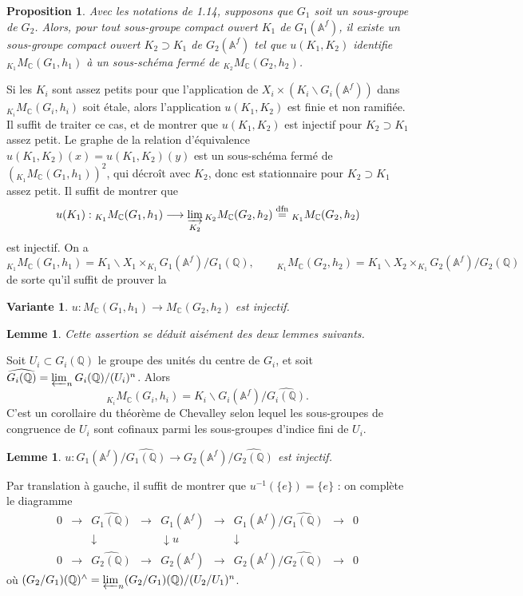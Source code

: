 \documentclass[11pt]{amsart}
\theoremstyle{plain}
\newtheorem{proposition}[theorem]{Proposition}
\newtheorem{lemma}[theorem]{Lemme}
\newtheorem{variante}{Variante}
\theoremstyle{definition}
\newcommand{\QQ}{\mathbb{Q}}
\newcommand{\AAf}{\mathbb{A}^f}
\newcommand{\MC}{M_{\mathbb{C}}}
\begin{document}
\begin{proposition}
Avec les notations de \emph{1.14}, supposons que $G_1$ soit un sous-groupe de $G_2$. Alors, pour tout sous-groupe compact ouvert $K_1$ de $G_1(\AAf)$, il existe un sous-groupe compact ouvert $K_2 \supset K_1$ de $G_2(\AAf)$ tel que $u(K_1, K_2)$ identifie ${}_{K_1} \MC(G_1, h_1)$ \`a un sous-sch\'ema ferm\'e de ${}_{K_2} \MC(G_2, h_2)$.
\end{proposition}

Si les $K_i$ sont assez petits pour que l'application de $X_i \times (K_i \backslash G_i(\AAf))$ dans ${}_{K_i} \MC(G_i, h_i)$ soit \'etale, alors l'application $u(K_1, K_2)$ est finie et non ramifi\'ee. Il suffit de traiter ce cas, et de montrer que $u(K_1, K_2)$ est injectif pour $K_2 \supset K_1$ assez petit. Le graphe de la relation d'\'equivalence $u(K_1, K_2)(x) = u(K_1, K_2)(y)$ est un sous-sch\'ema ferm\'e de $({}_{K_1} \MC(G_1, h_1))^2$, qui d\'ecro\^it avec $K_2$, donc est stationnaire pour $K_2 \supset K_1$ assez petit. Il suffit de montrer que
\[
u(K_1) : {}_{K_1} \MC(G_1, h_1) \longrightarrow \varinjlim_{K_2} {}_{K_2} \MC(G_2, h_2) \overset{\text{dfn}}{=} {}_{K_1} \MC(G_2, h_2)
\]
est injectif. On a
\[
{}_{K_1} \MC(G_1, h_1) = K_1 \backslash X_1 \times_{K_1} G_1(\AAf)/G_1(\QQ), \qquad {}_{K_1} \MC(G_2, h_2) = K_1 \backslash X_2 \times_{K_1} G_2(\AAf)/G_2(\QQ)
\]
de sorte qu'il suffit de prouver la

\begin{variante}
$u : \MC(G_1, h_1) \to \MC(G_2, h_2)$ est injectif.
\end{variante}

\begin{lemma}
Cette assertion se d\'eduit ais\'ement des deux lemmes suivants.
\end{lemma}

Soit $U_i \subset G_i(\QQ)$ le groupe des unit\'es du centre de $G_i$, et soit $\widehat{G_i(\QQ)} = \varprojlim_n G_i(\QQ)/(U_i)^n$. Alors
\[
{}_{K_i} \MC(G_i, h_i) = K_i \backslash G_i(\AAf)/\widehat{G_i(\QQ)}.
\]
C'est un corollaire du th\'eor\`eme de Chevalley selon lequel les sous-groupes de congruence de $U_i$ sont cofinaux parmi les sous-groupes d'indice fini de $U_i$.

\begin{lemma}
$u : G_1(\AAf)/\widehat{G_1(\QQ)} \longrightarrow G_2(\AAf)/\widehat{G_2(\QQ)}$ est injectif.
\end{lemma}

Par translation \`a gauche, il suffit de montrer que $u^{-1}(\{e\}) = \{e\}$ : on compl\`ete le diagramme
\[
\begin{array}{ccccccccc}
0 & \longrightarrow & \widehat{G_1(\QQ)} & \longrightarrow & G_1(\AAf) & \longrightarrow & G_1(\AAf)/\widehat{G_1(\QQ)} & \longrightarrow & 0 \\
  &                 & \downarrow      &                 & \downarrow  u   &                 & \downarrow      &                 &   \\
0 & \longrightarrow & \widehat{G_2(\QQ)} & \longrightarrow & G_2(\AAf) & \longrightarrow & G_2(\AAf)/\widehat{G_2(\QQ)} & \longrightarrow & 0
\end{array}
\]
o\`u $(G_2/G_1)(\QQ)^{\wedge} = \varprojlim_n (G_2/G_1)(\QQ)/(U_2/U_1)^n$.
\end{document}
